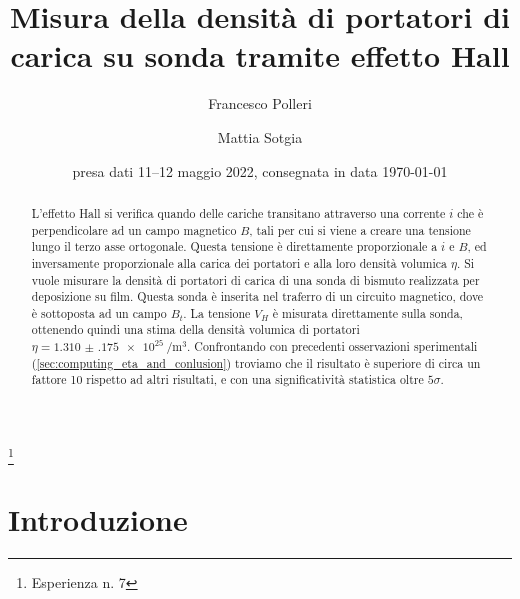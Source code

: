 \documentclass[
    prl,
    reprint, 
    superscriptaddress, 
    altaffilletter, 
    amsmath, 
    amssymb, 
    a4paper,
    varvw]{revtex4-2}
\begin{document}
\title{Misura della densità di portatori di carica su sonda tramite effetto Hall
}
\thanks{Esperienza n. 7
}

\author{Francesco Polleri}
\author{Mattia Sotgia}



\date{presa dati
    11--12 maggio 2022, consegnata in data 
    \today
}

\begin{abstract}
    L'effetto Hall si verifica quando delle cariche transitano attraverso una corrente $i$ che è perpendicolare ad un campo magnetico $B$, tali per cui si viene a creare una tensione lungo il terzo asse ortogonale. Questa tensione è direttamente proporzionale a $i$ e $B$, ed inversamente proporzionale alla carica dei portatori e alla loro densità volumica $\eta$.
    Si vuole misurare la densità di portatori di carica di una sonda di bismuto  realizzata per deposizione su film. Questa sonda è inserita nel traferro di un circuito magnetico, dove è sottoposta ad un campo $B_t$. La tensione $V_H$ è misurata direttamente sulla sonda, ottenendo quindi una stima della densità volumica di portatori $\eta=\SI{1.310(175)e+25}{\per\cubic\metre}$. Confrontando con precedenti osservazioni sperimentali (\ref{sec:computing_eta_and_conlusion}) troviamo che il risultato è superiore di circa un fattore 10 rispetto ad altri risultati, e con una significatività statistica oltre $5\sigma$.
\end{abstract}


\maketitle
\thispagestyle{fancy}
\SetBgContents{
}


\section{Introduzione}
\end{document}
